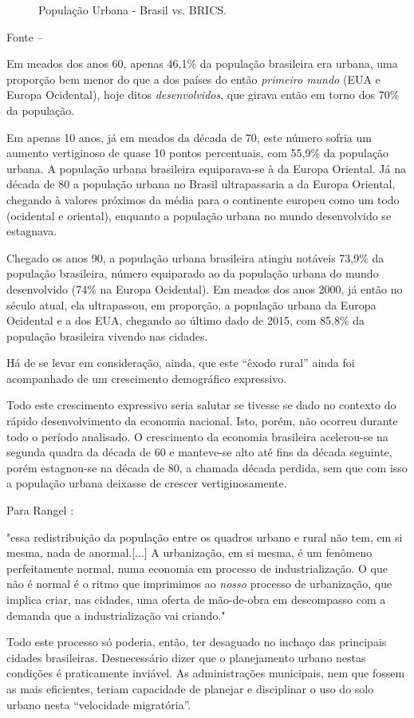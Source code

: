 \documentclass[
	12pt,				%
	oneside,			%
	a4paper,			%
	chapter=TITLE,		%
	section=TITLE,		%
	english,			%
	brazil				%
	]{abntex2}
\newcommand{\bcenter}{\begin{center}}
\newcommand{\ecenter}{\end{center}}
\begin{document}
\begin{refsection}
\begin{figure}[H]
{}

\caption{População Urbana - Brasil vs. \gls{BRICS}.}\label{fig:pop-urb-brazil-brics}
\end{figure}
\bcenter

\small Fonte -- \textcite{doi:10.1177/0959683609356587}
\ecenter

Em meados dos anos 60, apenas 46,1\% da população brasileira era urbana, uma
proporção bem menor do que a dos países do então \emph{primeiro mundo} (\gls{EUA} e
Europa Ocidental), hoje ditos \emph{desenvolvidos}, que girava então em torno dos 70\%
da população.

Em apenas 10 anos, já em meados da década de 70, este número sofria um aumento
vertiginoso de quase 10 pontos percentuais, com 55,9\% da população urbana. A
população urbana brasileira equiparava-se à da Europa Oriental.
Já na década de 80 a população urbana no Brasil ultrapassaria a da Europa
Oriental, chegando à valores próximos da média para o continente europeu como um
todo (ocidental e oriental), enquanto a população urbana no mundo desenvolvido
se estagnava.

Chegado os anos 90, a população urbana brasileira atingiu notáveis 73,9\% da
população brasileira, número equiparado ao da população urbana do mundo
desenvolvido (74\% na Europa Ocidental). Em meados dos anos 2000, já então no
século atual, ela ultrapassou, em proporção, a população urbana da Europa
Ocidental e a dos \gls{EUA}, chegando ao último dado de 2015, com 85,8\% da
população brasileira vivendo nas cidades.

Há de se levar em consideração, ainda, que este ``êxodo rural'' ainda foi
acompanhado de um crescimento demográfico expressivo.

Todo este crescimento expressivo seria salutar se tivesse se dado no contexto do
rápido desenvolvimento da economia nacional. Isto, porém, não ocorreu durante
todo o período analisado. O crescimento da economia brasileira acelerou-se na
segunda quadra da década de 60 e manteve-se alto até fins da década seguinte,
porém estagnou-se na década de 80, a chamada década perdida, sem que com isso a
população urbana deixasse de crescer vertiginosamente.

Para Rangel \autocite*[151]{rangel1986a}:
\begin{citacao}
"essa redistribuição da população entre os quadros urbano e rural não tem, em si
mesma, nada de anormal.[...] A urbanização, em si mesma, é um fenômeno
perfeitamente normal, numa economia em processo de industrialização. O que não é
normal é o ritmo que imprimimos ao \emph{nosso} processo de urbanização, que
implica criar, nas cidades, uma oferta de mão-de-obra em descompasso com a
demanda que a industrialização vai criando."
\end{citacao}
Todo este processo só poderia, então, ter desaguado no inchaço das principais
cidades brasileiras. Desnecessário dizer que o planejamento urbano nestas
condições é praticamente inviável. As administrações municipais, nem que fossem
as mais eficientes, teriam capacidade de planejar e disciplinar o uso do solo
urbano nesta ``velocidade migratória''.


\end{refsection}
\end{document}
